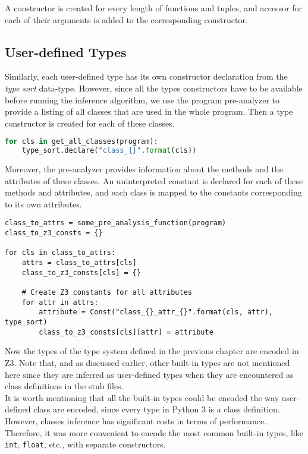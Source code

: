 A constructor is created for every length of functions and tuples, and accessor for each of their arguments is added to the corresponding constructor.

\subsection{User-defined Types}
Similarly, each user-defined type has its own constructor declaration from the \textit{type sort} data-type. However, since all the types constructors have to be available before running the inference algorithm, we use the program pre-analyzer to provide a listing of all classes that are used in the whole program. Then a type constructor is created for each of these classes. 

\begin{lstlisting}[language=python]
for cls in get_all_classes(program):
	type_sort.declare("class_{}".format(cls))
\end{lstlisting}

Moreover, the pre-analyzer provides information about the methods and the attributes of these classes. An uninterpreted constant is declared for each of these methods and attributes, and each class is mapped to the constants corresponding to its own attributes.

\begin{lstlisting}
class_to_attrs = some_pre_analysis_function(program)
class_to_z3_consts = {}

for cls in class_to_attrs:
    attrs = class_to_attrs[cls]
    class_to_z3_consts[cls] = {}
    
    # Create Z3 constants for all attributes
    for attr in attrs:
	    attribute = Const("class_{}_attr_{}".format(cls, attr), type_sort)
	    class_to_z3_consts[cls][attr] = attribute
\end{lstlisting}

Now the types of the type system defined in the previous chapter are encoded in Z3. Note that, and as discussed earlier, other built-in types are not mentioned here since they are inferred as user-defined types when they are encountered as class definitions in the stub files.\\

It is worth mentioning that all the built-in types could be encoded the way user-defined class are encoded, since every type in Python 3 is a class definition. However, classes inference has significant costs in terms of performance. Therefore, it was more convenient to encode the most common built-in types, like \lstinline|int|, \lstinline|float|, etc., with separate constructors.

